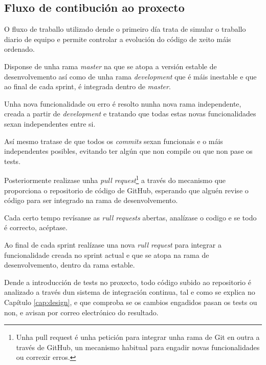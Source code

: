    \subsection{Fluxo de contibución ao proxecto}
    O fluxo de traballo utilizado dende o primeiro día trata de simular o 
traballo diario de equipo e permite controlar a evolución do código de xeito 
máis ordenado.

    Disponse de unha rama \emph{master} na que se atopa a versión estable de 
desenvolvemento así como de unha rama \emph{development} que é máis inestable e 
que ao final de cada sprint, é integrada dentro de \emph{master}.

    Unha nova funcionalidade ou erro é resolto nunha nova rama independente,
creada a partir de \emph{development} e tratando que todas estas novas 
funcionalidades sexan independentes entre si.

    Así mesmo tratase de que todos os \emph{commits} sexan funcionais e o máis 
independentes posibles, evitando ter algún que non compile ou que non pase 
os tests.

    Posteriormente realizase unha \emph{pull request}\footnote{Unha pull 
request é unha petición para integrar unha rama de Git en outra a través de 
GitHub, un mecanismo habitual para engadir novas funcionalidades ou correxir 
erros.} a través do mecanismo que proporciona o repositorio 
de código de GitHub, esperando que alguén revise o código para ser 
integrado na rama de desenvolvemento.

    Cada certo tempo revísanse as \emph{rull requests} abertas, analízase o 
codigo e se todo é correcto, acéptase.

    Ao final de cada sprint realízase una nova \emph{rull request} para 
integrar a funcionalidade creada no sprint actual e que se atopa na rama de 
desenvolvemento, dentro da rama estable.

    Dende a introducción de tests no proxecto, todo código subido ao 
repositorio é analizado a través dun sistema de integración continua, tal e 
como se explica no Capítulo \ref{cap:design}, e que comproba se os cambios 
engadidos pasan os tests ou non, e avisan por correo 
electrónico do resultado.


